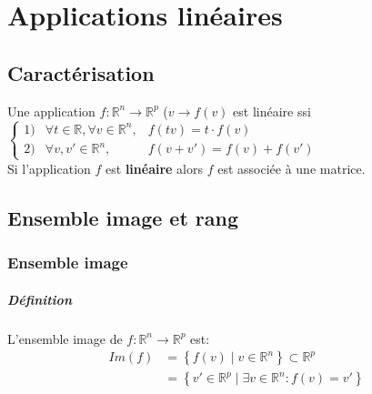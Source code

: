 \documentclass[10pt,a4paper]{book}
\newcommand{\R}{\mathbb{R}}
\begin{document}
\chapter{Applications linéaires}

\section{Caractérisation}
Une application \(f:\R^n \rightarrow \R^p\) (\(v \rightarrow f(v)\) est linéaire ssi \( \left\lbrace \begin{array}{rcl}
1) & \forall t \in \R, \forall v \in \R^n, & f(tv) = t\cdot f(v) \\
2) & \forall v, v' \in \R^n, & f(v+v') = f(v)+f(v') 
\end{array} \right.
\) \\
Si l'application $f$ est \textbf{linéaire} alors $f$ est associée à une matrice.

\section{Ensemble image et rang}

\subsection{Ensemble image}

\paragraph{Définition} L'ensemble image de $f: \R^n \rightarrow \R^p$ est:
\begin{equation}
\begin{split}
Im(f) & = \left\lbrace f(v) \; | \; v \in \R^n \right\rbrace \subset \R^p \\
 & = \left\lbrace v' \in \R^p \; | \; \exists v \in \R^n: f(v) = v' \right\rbrace
\end{split}
\end{equation}

\end{document}

